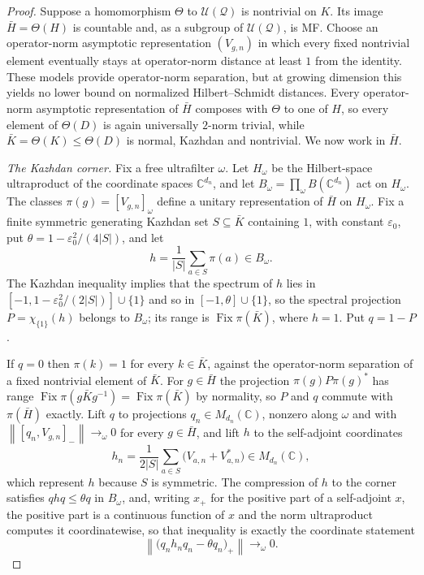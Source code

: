 \documentclass[11pt]{amsart}
\theoremstyle{definition}
\theoremstyle{remark}
\theoremstyle{plain}
\newcommand{\C}{\mathbb C}
\newcommand{\U}{\mathcal U}
\newcommand{\opnorm}[1]{\left\lVert #1\right\rVert}
\begin{document}
\begin{proof}
Suppose a homomorphism $\Theta$ to $\U(\mathcal Q)$ is nontrivial on
$K$.  Its image $\bar H=\Theta(H)$ is countable and, as a subgroup of
$\U(\mathcal Q)$, is MF.  Choose an operator-norm
asymptotic representation
$(V_{g,n})$ in which every fixed nontrivial element eventually stays
at operator-norm distance at least $1$ from the identity.  These
models provide operator-norm separation, but at growing dimension this
yields no lower bound on normalized Hilbert--Schmidt distances.  Every
operator-norm asymptotic representation of $\bar H$ composes with
$\Theta$ to one of $H$, so every element of $\Theta(D)$ is again
universally $2$-norm trivial, while $\bar K=\Theta(K)\le\Theta(D)$ is normal,
Kazhdan and nontrivial.  We now work in $\bar H$.

\emph{The Kazhdan corner.}  Fix a free ultrafilter $\omega$.  Let
$H_\omega$ be the Hilbert-space ultraproduct of the coordinate spaces
$\C^{d_n}$, and let $B_\omega=\prod_\omega B(\C^{d_n})$ act on
$H_\omega$.  The classes
$\pi(g)=[V_{g,n}]_\omega$ define a unitary representation of $\bar H$
on $H_\omega$.  Fix a finite symmetric generating Kazhdan set
$S\subseteq\bar K$ containing $1$, with constant $\varepsilon_0$, put
$\theta=1-\varepsilon_0^{2}/(4|S|)$, and let
\[
 h=\frac1{|S|}\sum_{a\in S}\pi(a)\in B_\omega .
\]
The Kazhdan inequality implies that the spectrum of $h$ lies in
$[-1,1-\varepsilon_0^{2}/(2|S|)]\cup\{1\}$ and so in
$[-1,\theta]\cup\{1\}$, so the spectral projection $P=\chi_{\{1\}}(h)$
belongs to $B_\omega$; its range is $\operatorname{Fix}\pi(\bar K)$,
where $h=1$.  Put $q=1-P$.

If $q=0$ then $\pi(k)=1$ for every $k\in\bar K$, against the
operator-norm separation of a fixed nontrivial element of $\bar K$.
For $g\in\bar H$ the projection $\pi(g)P\pi(g)^{*}$ has range
$\operatorname{Fix}\pi(g\bar Kg^{-1})=\operatorname{Fix}\pi(\bar K)$ by
normality, so $P$ and $q$ commute with $\pi(\bar H)$ exactly.  Lift $q$
to projections $q_n\in M_{d_n}(\C)$, nonzero along $\omega$ and with
$\opnorm{[q_n,V_{g,n}]_{-}}\to_\omega0$ for every $g\in\bar H$, and lift
$h$ to the self-adjoint coordinates
\[
 h_n=\frac1{2|S|}\sum_{a\in S}\bigl(V_{a,n}+V_{a,n}^{*}\bigr)
 \in M_{d_n}(\C),
\]
which represent $h$ because $S$ is symmetric.  The compression of $h$
to the corner satisfies $qhq\le\theta q$ in $B_\omega$, and, writing
$x_{+}$ for the positive part of a self-adjoint $x$, the positive part
is a continuous function of $x$ and the norm ultraproduct computes it
coordinatewise, so that inequality is exactly the coordinate statement
\begin{equation}\label{eq:corner-spectral}
 \opnorm{\bigl(q_nh_nq_n-\theta q_n\bigr)_{+}}\to_\omega0 .
\end{equation}


\end{proof}
\end{document}
